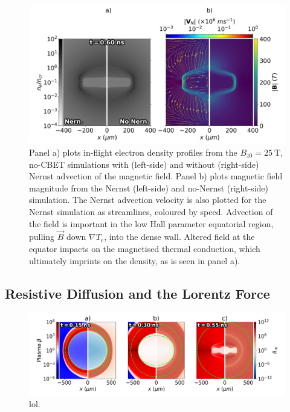 \begin{figure}[t!]
    \includegraphics[width=0.8\linewidth]{Results2/Images/nernst_comp.png}
    \centering
    \caption{Panel a) plots in-flight electron density profiles from the $B_{z0}=25\ \text{T}$, no-\ac{CBET} simulations with (left-side) and without (right-side) Nernst advection of the magnetic field.
    Panel b) plots magnetic field magnitude from the Nernst (left-side) and no-Nernst (right-side) simulation.
    The Nernst advection velocity is also plotted for the Nernst simulation as streamlines, coloured by speed.
    Advection of the field is important in the low Hall parameter equatorial region, pulling $\vec{B}$ down $\nabla T_e$, into the dense wall.
    Altered field at the equator impacts on the magnetised thermal conduction, which ultimately imprints on the density, as is seen in panel a).}%
    \label{fig:Res2_nernst_comp}
\end{figure}



\subsection{Resistive Diffusion and the Lorentz Force}%
\label{sec:Res2_resis}


\begin{figure}[t!]
    \includegraphics[width=\linewidth]{Results2/Images/magmag_beta_Rm.png}
    \centering
    \caption{lol.}%
    \label{fig:Res2_magmag_beta_Rm}
\end{figure}



